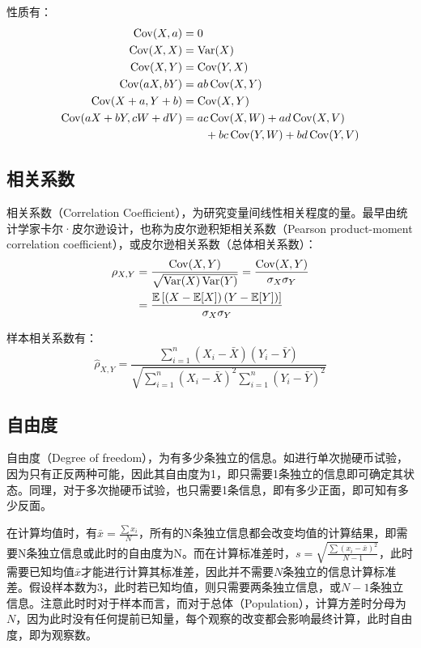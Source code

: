 \documentclass[11pt]{article}
\begin{document}
性质有：
\begin{align*}
    \operatorname{Cov}(X,a) &= 0 \\
    \operatorname{Cov}(X,X) &= \operatorname{Var}(X) \\
    \operatorname{Cov}(X,Y) &= \operatorname{Cov}(Y,X) \\
    \operatorname{Cov}(aX,bY) &= ab\operatorname{Cov}(X,Y) \\
    \operatorname{Cov}(X+a,Y+b) &= \operatorname{Cov}(X,Y) \\
    \operatorname{Cov}(aX+bY,cW+dV) &= ac\operatorname{Cov}(X,W)+ad\operatorname{Cov}(X,V) \\
    &\hspace{2em} +bc\operatorname{Cov}(Y,W)+bd\operatorname{Cov}(Y,V)
\end{align*}

\subsection{相关系数}

相关系数（Correlation Coefficient），为研究变量间线性相关程度的量。最早由统计学家卡尔·皮尔逊设计，也称为皮尔逊积矩相关系数（Pearson product-moment correlation coefficient），或皮尔逊相关系数（总体相关系数）：
\begin{align*}
    \rho_{X,Y} &= \frac{\operatorname{Cov}(X,Y)}{\sqrt{\operatorname{Var}(X)\operatorname{Var}(Y)}}
    = \frac{\operatorname{Cov}(X,Y)}{\sigma_X\sigma_Y} \\
    &= \frac{\mathbb{E}\left[\left(X-\mathbb{E}[X]\right)\left(Y-\mathbb{E}[Y]\right)\right]}{\sigma_X\sigma_Y}
\end{align*}

样本相关系数有：
\begin{equation*}
    \hat{\rho}_{X,Y} = \frac{\sum_{i=1}^{n}\left(X_i - \bar{X}\right)\left(Y_i - \bar{Y}\right)}{\sqrt{\sum_{i=1}^{n}\left(X_i - \bar{X}\right)^2 \sum_{i=1}^{n}\left(Y_i - \bar{Y}\right)^2}}
\end{equation*}

\subsection{自由度}

自由度（Degree of freedom），为有多少条独立的信息。如进行单次抛硬币试验，因为只有正反两种可能，因此其自由度为1，即只需要1条独立的信息即可确定其状态。同理，对于多次抛硬币试验，也只需要1条信息，即有多少正面，即可知有多少反面。

在计算均值时，有$\bar{x} = \tfrac{\sum x_i}{N}$，所有的N条独立信息都会改变均值的计算结果，即需要N条独立信息或此时的自由度为N。而在计算标准差时，$s = \sqrt{\frac{\sum (x_i - \bar{x})^2}{N-1}}$，此时需要已知均值$\bar{x}$才能进行计算其标准差，因此并不需要$N$条独立的信息计算标准差。假设样本数为3，此时若已知均值，则只需要两条独立信息，或$N-1$条独立信息。注意此时时对于样本而言，而对于总体（Population），计算方差时分母为$N$，因为此时没有任何提前已知量，每个观察的改变都会影响最终计算，此时自由度，即为观察数。
\end{document}
